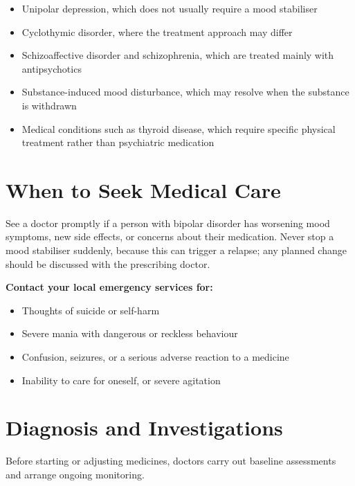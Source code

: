 \begin{itemize}
    \item Unipolar depression, which does not usually require a mood stabiliser
    \item Cyclothymic disorder, where the treatment approach may differ
    \item Schizoaffective disorder and schizophrenia, which are treated mainly with antipsychotics
    \item Substance-induced mood disturbance, which may resolve when the substance is withdrawn
    \item Medical conditions such as thyroid disease, which require specific physical treatment rather than psychiatric medication
\end{itemize}

\section*{When to Seek Medical Care}
See a doctor promptly if a person with bipolar disorder has worsening mood symptoms, new side effects, or concerns about their medication. Never stop a mood stabiliser suddenly, because this can trigger a relapse; any planned change should be discussed with the prescribing doctor.

\textbf{Contact your local emergency services for:}
\begin{itemize}
    \item Thoughts of suicide or self-harm
    \item Severe mania with dangerous or reckless behaviour
    \item Confusion, seizures, or a serious adverse reaction to a medicine
    \item Inability to care for oneself, or severe agitation
\end{itemize}

\section*{Diagnosis and Investigations}
Before starting or adjusting medicines, doctors carry out baseline assessments and arrange ongoing monitoring.

